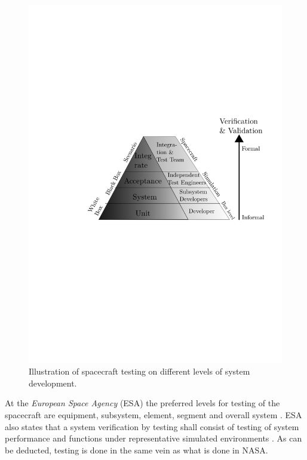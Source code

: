 \documentclass[english,12pt,a4paper,pdftex,elec,utf8]{aaltothesis}
\begin{document}
\begin{figure}[h!]
\centering
\includegraphics[scale=0.8]{spacetestingnew}
\caption{Illustration of spacecraft testing on different levels of system development. \cite{softacceptancespace, tor}}
\label{testlevelchart}
\end{figure}
At the \textit{European Space Agency} (ESA) the preferred levels for testing of the spacecraft are equipment, subsystem, element, segment and overall system \cite{ecss}. ESA also states that a system verification by testing shall consist of testing of system performance and functions under representative simulated environments \cite{ecss}. As can be deducted, testing is done in the same vein as what is done in NASA. \par 
\end{document}
